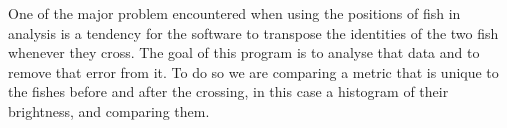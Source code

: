 \documentclass{article}
\makeatletter
\renewcommand\section{\clearpage\newpage\@startsection {section}{1}{\z@}%
	{-3.5ex \@plus -1ex \@minus -.2ex}%
	{2.3ex \@plus.2ex}%
	{\normalfont\Large\bfseries}}
\makeatother
\begin{document}

One of the major problem encountered when using the positions of fish in analysis is a tendency for the software to transpose the identities of the two fish whenever they cross. The goal of this program is to analyse that data and to remove that error from it. To do so we are comparing a metric that is unique to the fishes before and after the crossing, in this case a histogram of their brightness, and comparing them.
\end{document}
